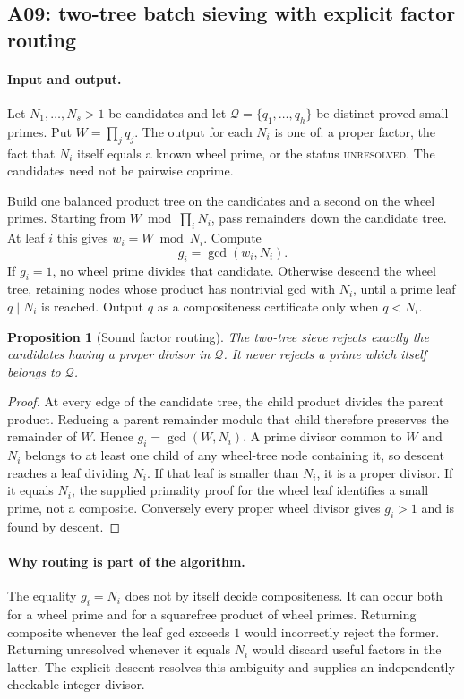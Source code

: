 \documentclass[11pt,a4paper]{article}
\newtheorem{proposition}[theorem]{Proposition}
\theoremstyle{definition}\newtheorem{definition}[theorem]{Definition}
\theoremstyle{remark}\newtheorem{remark}[theorem]{Remark}
\begin{document}
\subsection{A09: two-tree batch sieving with explicit factor routing}
\label{alg:A09}

\paragraph{Input and output.}
Let $N_1,\ldots,N_s>1$ be candidates and let
$\mathcal Q=\{q_1,\ldots,q_h\}$ be distinct proved small primes. Put
$W=\prod_j q_j$. The output for each $N_i$ is one of:
a proper factor, the fact that $N_i$ itself equals a known wheel prime,
or the status \textsc{unresolved}. The candidates need not be pairwise
coprime.

Build one balanced product tree on the candidates and a second on the wheel
primes. Starting from $W\bmod\prod_iN_i$, pass remainders down the candidate
tree. At leaf $i$ this gives $w_i=W\bmod N_i$. Compute
\[
 g_i=\gcd(w_i,N_i).
\]
If $g_i=1$, no wheel prime divides that candidate. Otherwise descend the
wheel tree, retaining nodes whose product has nontrivial gcd with $N_i$,
until a prime leaf $q\mid N_i$ is reached. Output $q$ as a compositeness
certificate only when $q<N_i$.

\begin{proposition}[Sound factor routing]\label{prop:A09}
The two-tree sieve rejects exactly the candidates having a proper divisor
in $\mathcal Q$. It never rejects a prime which itself belongs to
$\mathcal Q$.
\end{proposition}
\begin{proof}
At every edge of the candidate tree, the child product divides the parent
product. Reducing a parent remainder modulo that child therefore preserves
the remainder of $W$. Hence $g_i=\gcd(W,N_i)$. A prime divisor common to
$W$ and $N_i$ belongs to at least one child of any wheel-tree node containing
it, so descent reaches a leaf dividing $N_i$. If that leaf is smaller than
$N_i$, it is a proper divisor. If it equals $N_i$, the supplied primality
proof for the wheel leaf identifies a small prime, not a composite.
Conversely every proper wheel divisor gives $g_i>1$ and is found by descent.
\end{proof}

\paragraph{Why routing is part of the algorithm.}
The equality $g_i=N_i$ does not by itself decide compositeness. It can occur
both for a wheel prime and for a squarefree product of wheel primes.
Returning composite whenever the leaf gcd exceeds $1$ would incorrectly
reject the former. Returning unresolved whenever it equals $N_i$ would
discard useful factors in the latter. The explicit descent resolves this
ambiguity and supplies an independently checkable integer divisor.
\end{document}
